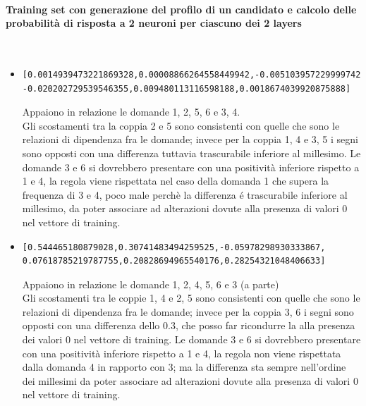 \paragraph{Training set con generazione del profilo di un candidato e calcolo delle probabilit\`a di risposta a 2 neuroni per ciascuno dei 2 layers}\mbox{}
\label{Training set con generazione del profilo di un candidato e calcolo delle probabilita di risposta a 2 neuroni per ciascuno dei 2 layers}
\\
\noindent
\begin{itemize}
\item \begin{verbatim}[0.0014939473221869328,0.00008866264558449942,-0.0051039572299997425,
-0.020202729539546355,0.009480113116598188,0.0018674039920875888]
\end{verbatim}
Appaiono in relazione le domande 1, 2, 5, 6  e 3, 4.\\
Gli scostamenti tra la coppia 2 e 5 sono consistenti con quelle che sono le relazioni di dipendenza fra le domande; invece per la coppia 1, 4 e 3, 5 i segni sono opposti con una differenza tuttavia trascurabile inferiore al millesimo.
Le domande 3 e 6 si dovrebbero presentare con una positivit\`a inferiore rispetto a 1 e 4, la regola viene rispettata nel caso della domanda 1 che supera la frequenza di 3 e 4, poco male perch\`e la differenza \'e trascurabile inferiore al millesimo, da poter associare ad alterazioni dovute alla presenza di valori 0 nel vettore di training.

\item \begin{verbatim}[0.544465180879028,0.30741483494259525,-0.05978298930333867,
0.07618785219787755,0.20828694965540176,0.28254321048406633]
\end{verbatim}
Appaiono in relazione le domande 1, 2,  4, 5, 6 e 3 (a parte)\\
Gli scostamenti tra le coppie 1, 4 e 2, 5 sono consistenti con quelle che sono le relazioni di dipendenza fra le domande; invece per la coppia 3, 6 i segni sono opposti con una differenza dello 0.3, che posso far ricondurre la alla presenza dei valori 0 nel vettore di training.
Le domande 3 e 6 si dovrebbero presentare con una positivit\`a inferiore rispetto a 1 e 4, la regola non viene rispettata dalla domanda 4 in rapporto con 3; ma la differenza sta sempre nell'ordine dei millesimi da poter associare ad alterazioni dovute alla presenza di valori 0 nel vettore di training.


\end{itemize}
